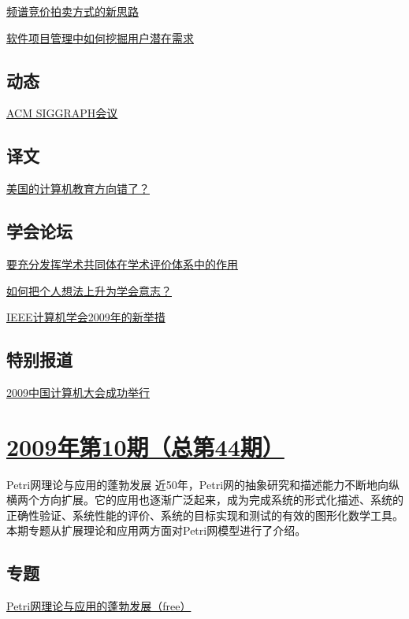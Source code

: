 \documentclass[a4paper]{article}
\begin{document}
\href{http://history.ccf.org.cn/resources/1190201776262/2010/04/15/045059.pdf}{频谱竞价拍卖方式的新思路}

\href{http://history.ccf.org.cn/resources/1190201776262/2010/04/15/045063.pdf}{软件项目管理中如何挖掘用户潜在需求}

\subsection{动态}
\href{http://history.ccf.org.cn/resources/1190201776262/2010/04/15/045068.pdf}{ACM SIGGRAPH会议}

\subsection{译文}
\href{http://history.ccf.org.cn/resources/1190201776262/2010/04/15/045072.pdf}{美国的计算机教育方向错了？}

\subsection{学会论坛}
\href{http://history.ccf.org.cn/resources/1190201776262/2010/04/15/045088.pdf}{要充分发挥学术共同体在学术评价体系中的作用}

\href{http://history.ccf.org.cn/resources/1190201776262/2010/04/15/045090.pdf}{如何把个人想法上升为学会意志？}

\href{http://history.ccf.org.cn/resources/1190201776262/2010/04/15/045092.pdf}{IEEE计算机学会2009年的新举措}

\subsection{特别报道}
\href{http://history.ccf.org.cn/resources/1190201776262/2010/04/15/045006.pdf}{2009中国计算机大会成功举行}


\section{\href{http://history.ccf.org.cn/sites/ccf/jsjtbbd.jsp?contentId=2542567629049}{\textbf{2009年第10期（总第44期）}}}
Petri网理论与应用的蓬勃发展 近50年，Petri网的抽象研究和描述能力不断地向纵横两个方向扩展。它的应用也逐渐广泛起来，成为完成系统的形式化描述、系统的正确性验证、系统性能的评价、系统的目标实现和测试的有效的图形化数学工具。本期专题从扩展理论和应用两方面对Petri网模型进行了介绍。
\subsection{专题}
\href{http://history.ccf.org.cn/resources/1190201776262/2010/04/15/044006.pdf}{Petri网理论与应用的蓬勃发展（free）}
\end{document}
